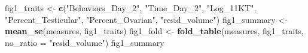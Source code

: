 \documentclass[
  landscape]{article}
\newenvironment{Shaded}{\begin{snugshade}}{\end{snugshade}}
\newcommand{\AttributeTok}[1]{\textcolor[rgb]{0.13,0.29,0.53}{#1}}
\newcommand{\FunctionTok}[1]{\textcolor[rgb]{0.13,0.29,0.53}{\textbf{#1}}}
\newcommand{\NormalTok}[1]{#1}
\newcommand{\OtherTok}[1]{\textcolor[rgb]{0.56,0.35,0.01}{#1}}
\newcommand{\StringTok}[1]{\textcolor[rgb]{0.31,0.60,0.02}{#1}}
\begin{document}
\begin{Shaded}
\begin{Highlighting}[]
\NormalTok{fig1\_traits }\OtherTok{\textless{}{-}} \FunctionTok{c}\NormalTok{(}\StringTok{"Behaviors\_Day\_2"}\NormalTok{, }\StringTok{"Time\_Day\_2"}\NormalTok{, }\StringTok{"Log\_11KT"}\NormalTok{,}
                 \StringTok{"Percent\_Testicular"}\NormalTok{, }\StringTok{"Percent\_Ovarian"}\NormalTok{, }\StringTok{"resid\_volume"}\NormalTok{)}
\NormalTok{fig1\_summary }\OtherTok{\textless{}{-}} \FunctionTok{mean\_se}\NormalTok{(measures, fig1\_traits)}
\NormalTok{fig1\_fold }\OtherTok{\textless{}{-}} \FunctionTok{fold\_table}\NormalTok{(measures, fig1\_traits, }\AttributeTok{no\_ratio =} \StringTok{"resid\_volume"}\NormalTok{)}
\NormalTok{fig1\_summary}
\end{Highlighting}
\end{Shaded}
\end{document}
